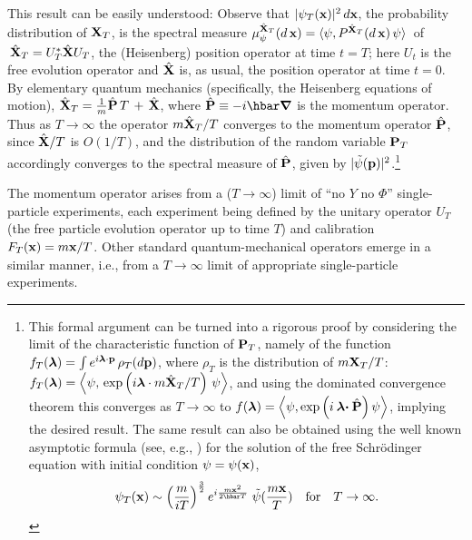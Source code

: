 \documentclass[12pt]{article}
\newcommand{\Sc}{Schr\"{o}dinger}
\begin{document}
This result can be easily understood: Observe that $|\psi_{T}({\bf
   x})|^{2}\, d{\bf x}$, the probability distribution of ${\bf X}_{T}$,
is the spectral measure $\mu_{\psi}^{ \hat{\bf X}_{T}} (d\,{\bf x})
=\langle\psi, P^{\hat{\bf X}_{T} }(d\,{\bf x})\,\psi\rangle\, $ of
$\,\hat{\bf X}_{T}= U_{T}^{*} \hat{\bf X} U_{T}$, the (Heisenberg)
position operator at time $t=T$; here $U_{t}$ is the free evolution
operator and $\hat{\bf X}$ is, as usual, the position operator at time
$t=0$.  By elementary quantum mechanics (specifically, the Heisenberg
equations of motion), $\hat{\bf X}_T = \frac{1}{m}\hat{\bf P}\,T\, +\,
\hat{\bf X}$, where $\hat{\bf P}\equiv -i\hbar\boldsymbol{\nabla}$ is
the momentum operator.  Thus as $T\to\infty$ the operator $ m{\hat{\bf
     X}_T}/{T}$ converges to the momentum operator $ \hat{\bf P} $,
since $ \hat{\bf X}/T $ is $ O(1/T) $, and the distribution of the
random variable ${\bf P}_{T}$ accordingly converges to the spectral
measure of $\hat {\bf P}$, given by $|\tilde{\psi}({\bf
   p})|^2$.\footnote{\label{foot:conv} This formal argument can be
   turned into a rigorous proof by considering the limit of the
   characteristic function of ${\bf P}_T $, namely of the function
   $f_{T}(\boldsymbol{\lambda})= \int e^{i \boldsymbol{\lambda} \cdot
     {\bf p} }\,\rho_T(d{\bf p})$, where $\rho_{T}$ is the distribution
   of $m{{\bf X}_T}/{ T} $: $f_{T}(\boldsymbol{\lambda})=\left\langle
     \psi,\, \exp \left(i\boldsymbol{\lambda} \cdot m{\hat{{\bf
             X}}_T}/{ T} \right) \, \psi \right\rangle $, and using the
   dominated convergence theorem \cite{RS80} this converges as
   $T\to\infty$ to $ f(\boldsymbol{\lambda})=\left\langle \psi,
     \exp\left(i \boldsymbol{\lambda \cdot} \hat{\bf
         P}\right)\psi\right\rangle$, implying the desired result.  The
   same result can also be obtained using the well known asymptotic
   formula (see, e.g., \cite{RS75}) for the solution of the free \Sc{}
   equation with initial condition $\psi =\psi({\bf x})$,
   $$
   \psi_T({\bf x}) \sim \left(\frac{m}{iT}\right)^{\frac{3}{2}} e^{i
     \frac{m{\bf x}^2}{2\hbar T}}\; \tilde{\psi}(\frac{m{\bf x}}{T})
   \quad\mbox{for}\quad T\to\infty.  $$}

The momentum operator arises {}from a ($T\to\infty$) limit of ``no $Y$
no $\Phi$'' single-particle experiments, each experiment being defined
by the unitary operator $U_{T}$ (the free particle evolution operator
up to time $T$) and calibration $ F_{T}({\bf x}) = m{\bf x}/{ T}$.
Other standard quantum-mechanical operators emerge in a similar
manner, i.e., {}from a $T\to\infty$ limit of appropriate
single-particle experiments.
\end{document}
